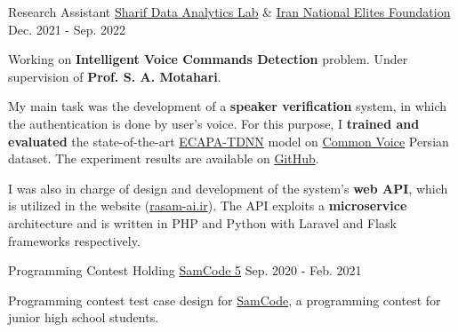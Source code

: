 

\begin{cventries}

  \cventry
    {Research Assistant} %
    {\href{https://www.sharif.edu/}{Sharif Data Analytics Lab} \& \href{https://en.bmn.ir/}{Iran National Elites Foundation}} %
    {} %
    {Dec. 2021 - Sep. 2022} %
    {
      \begin{cvitems} %
        \item {Working on \textbf{Intelligent Voice Commands Detection} problem. Under supervision of \textbf{Prof. S. A. Motahari}.}
        \item {My main task was the development of a \textbf{speaker verification} system, in which the authentication is done by user's voice. For this purpose, I \textbf{trained and evaluated} the state-of-the-art \href{https://arxiv.org/abs/2005.07143}{ECAPA-TDNN} model on \href{https://commonvoice.mozilla.org}{Common Voice} Persian dataset. The experiment results are available on \href{https://github.com/Sharif-DAL-INEF-1400/Verification-and-Identification-Speechbrain}{GitHub}.}
        \item{I was also in charge of design and development of the system's \textbf{web API}, which is utilized in the website (\href{https://rasam-ai.ir/}{rasam-ai.ir}). The API exploits a \textbf{microservice} architecture and is written in PHP and Python with Laravel and Flask frameworks respectively.}
      \end{cvitems}
    }

  \cventry
    {Programming Contest Holding} %
    {\href{https://samcode.allamehelli3.ir/staff.html}{SamCode 5}} %
    {} %
    {Sep. 2020 - Feb. 2021} %
    {
      \begin{cvitems} %
        \item {Programming contest test case design for {\href{https://samcode.allamehelli3.ir/}{SamCode}}, a programming contest for junior high school students.}
      \end{cvitems}
    }


\end{cventries}
